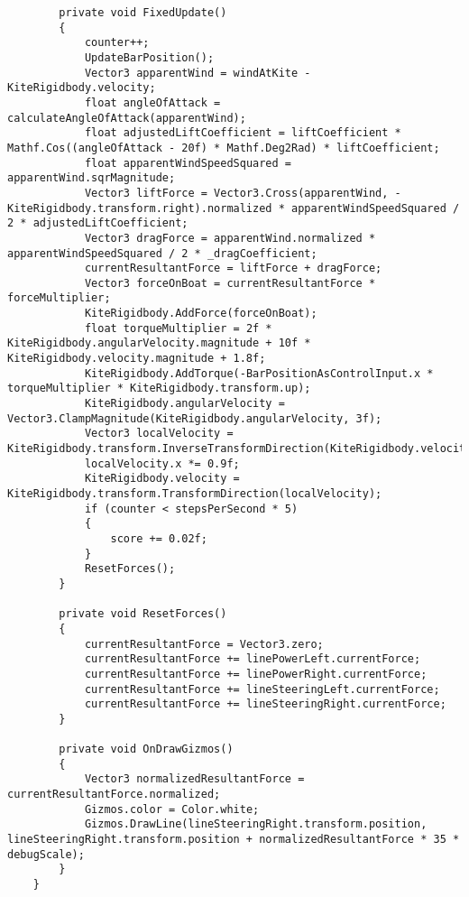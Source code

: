 \begin{lstlisting}
        private void FixedUpdate()
        {
            counter++;
            UpdateBarPosition();
            Vector3 apparentWind = windAtKite - KiteRigidbody.velocity;
            float angleOfAttack = calculateAngleOfAttack(apparentWind);
            float adjustedLiftCoefficient = liftCoefficient * Mathf.Cos((angleOfAttack - 20f) * Mathf.Deg2Rad) * liftCoefficient;
            float apparentWindSpeedSquared = apparentWind.sqrMagnitude;
            Vector3 liftForce = Vector3.Cross(apparentWind, -KiteRigidbody.transform.right).normalized * apparentWindSpeedSquared / 2 * adjustedLiftCoefficient;
            Vector3 dragForce = apparentWind.normalized * apparentWindSpeedSquared / 2 * _dragCoefficient;
            currentResultantForce = liftForce + dragForce;
            Vector3 forceOnBoat = currentResultantForce * forceMultiplier;
            KiteRigidbody.AddForce(forceOnBoat);
            float torqueMultiplier = 2f * KiteRigidbody.angularVelocity.magnitude + 10f * KiteRigidbody.velocity.magnitude + 1.8f;
            KiteRigidbody.AddTorque(-BarPositionAsControlInput.x * torqueMultiplier * KiteRigidbody.transform.up);
            KiteRigidbody.angularVelocity = Vector3.ClampMagnitude(KiteRigidbody.angularVelocity, 3f);
            Vector3 localVelocity = KiteRigidbody.transform.InverseTransformDirection(KiteRigidbody.velocity);
            localVelocity.x *= 0.9f;
            KiteRigidbody.velocity = KiteRigidbody.transform.TransformDirection(localVelocity);
            if (counter < stepsPerSecond * 5)
            {
                score += 0.02f;
            }
            ResetForces();
        }
    
        private void ResetForces()
        {
            currentResultantForce = Vector3.zero;
            currentResultantForce += linePowerLeft.currentForce;
            currentResultantForce += linePowerRight.currentForce;
            currentResultantForce += lineSteeringLeft.currentForce;
            currentResultantForce += lineSteeringRight.currentForce;
        }
    
        private void OnDrawGizmos()
        {
            Vector3 normalizedResultantForce = currentResultantForce.normalized;
            Gizmos.color = Color.white;
            Gizmos.DrawLine(lineSteeringRight.transform.position, lineSteeringRight.transform.position + normalizedResultantForce * 35 * debugScale);
        }
    }
    
\end{lstlisting}  


